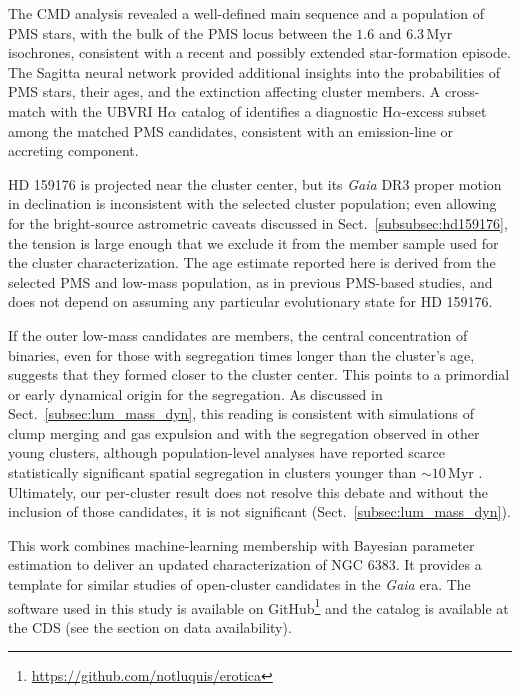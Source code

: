 \documentclass{aa}
\begin{document}
The CMD analysis revealed a well-defined main sequence and a population of PMS stars, with the bulk of the PMS locus between the $1.6$ and $6.3\,\mathrm{Myr}$ isochrones, consistent with a recent and possibly extended star-formation episode. The Sagitta neural network provided additional insights into the probabilities of PMS stars, their ages, and the extinction affecting cluster members. A cross-match with the UBVRI H$\alpha$ catalog of \citet{2010AA...511A..25R} identifies a diagnostic H$\alpha$-excess subset among the matched PMS candidates, consistent with an emission-line or accreting component.

HD 159176 is projected near the cluster center, but its \textit{Gaia} DR3 proper motion in declination is inconsistent with the selected cluster population; even allowing for the bright-source astrometric caveats discussed in Sect.~\ref{subsubsec:hd159176}, the tension is large enough that we exclude it from the member sample used for the cluster characterization. The age estimate reported here is derived from the selected PMS and low-mass population, as in previous PMS-based studies, and does not depend on assuming any particular evolutionary state for HD 159176.

If the outer low-mass candidates are members, the central concentration of binaries, even for those with segregation times longer than the cluster's age, suggests that they formed closer to the cluster center. This points to a primordial or early dynamical origin for the segregation. As discussed in Sect.~\ref{subsec:lum_mass_dyn}, this reading is consistent with simulations of clump merging and gas expulsion and with the segregation observed in other young clusters, although population-level analyses have reported scarce statistically significant spatial segregation in clusters younger than $\sim10\,\mathrm{Myr}$ \citep{2026AJ....171..236Z}. Ultimately, our per-cluster result does not resolve this debate and without the inclusion of those candidates, it is not significant (Sect.~\ref{subsec:lum_mass_dyn}).

This work combines machine-learning membership with Bayesian parameter estimation to deliver an updated characterization of NGC 6383. It provides a template for similar studies of open-cluster candidates in the \textit{Gaia} era. The software used in this study is available on GitHub\footnote{\href{https://github.com/notluquis/erotica}{https://github.com/notluquis/erotica}} and the catalog is available at the CDS (see the section on data availability).
\end{document}
